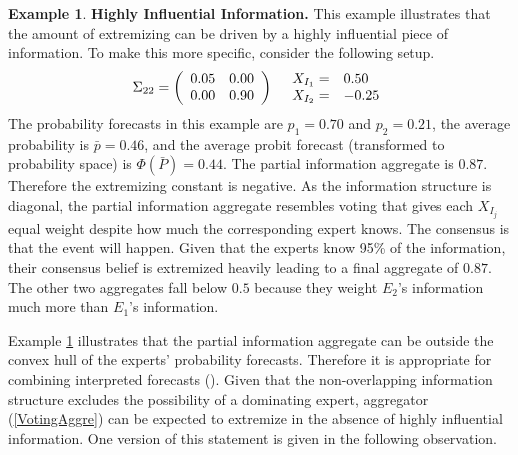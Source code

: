 \documentclass[11pt]{article}
\theoremstyle{definition}
\newtheorem{example}[theorem]{Example}
\theoremstyle{definition}
\begin{document}
\begin{example}
\label{KeyInfo}
\textbf{Highly Influential Information.} This example illustrates that the amount of extremizing can be driven by a highly influential piece of information. To make this more specific, consider the following setup.
\begin{align*}
\Sigma_{22} =  \left(\begin{array}{c c}
0.05 & 0.00\\
0.00 & 0.90 \\
 \end{array}\right)
  && 
  \begin{array}{l l}
X_{I_1} =& 0.50\\
X_{I_2} =& -0.25
 \end{array}
\end{align*}
The probability forecasts in this example are $p_1 = 0.70$ and $p_2 = 0.21$, the average probability is $\bar{p} = 0.46$, and the average probit forecast (transformed to probability space) is $\Phi(\bar{P}) = 0.44$.  The partial information aggregate is $0.87$. Therefore the extremizing constant is negative. As the information structure is diagonal, the partial information aggregate resembles voting that gives each $X_{I_j}$ equal weight despite how much the corresponding expert knows. The consensus is that the event will happen. Given that the experts know 95\% of the information, their consensus belief is extremized heavily leading to a final aggregate of $0.87$. The other two aggregates fall below $0.5$ because they weight $E_2$'s information much more than $E_1$'s information.
\end{example}

Example \ref{KeyInfo} illustrates that the partial information aggregate can be outside the convex hull of the experts' probability forecasts. Therefore it is appropriate for combining interpreted forecasts (\cite{parunak2013characterizing}). Given that the non-overlapping information structure excludes the possibility of a dominating expert, aggregator (\ref{VotingAggre}) can be expected to extremize in the absence of highly influential information. 
% 
One version of this statement is given in the following observation.
 
\end{document}
